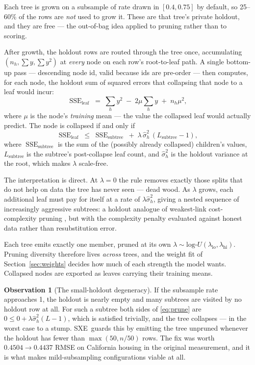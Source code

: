 \documentclass[11pt,a4paper]{article}
\newcommand{\SXE}{\textsc{SXE}}
\DeclareMathOperator{\SSE}{SSE}
\theoremstyle{definition}
\newtheorem{observation}{Observation}
\begin{document}
Each tree is grown on a subsample of rate drawn in $[0.4, 0.75]$ by default, so
25--60\% of the rows are \emph{not} used to grow it. These are that tree's
private holdout, and they are free --- the out-of-bag idea \cite{breiman1996oob}
applied to pruning rather than to scoring.

After growth, the holdout rows are routed through the tree once, accumulating
$(n_h, \sum y, \sum y^2)$ at \emph{every} node on each row's root-to-leaf path.
A single bottom-up pass --- descending node id, valid because ids are
pre-order --- then computes, for each node, the holdout sum of squared errors
that collapsing that node to a leaf would incur:
\begin{equation}\label{eq:sseleaf}
\SSE_{\text{leaf}} \;=\; \sum_h y^2 \;-\; 2\mu \sum_h y \;+\; n_h \mu^2,
\end{equation}
where $\mu$ is the node's \emph{training} mean --- the value the collapsed leaf
would actually predict. The node is collapsed if and only if
\begin{equation}\label{eq:prune}
\SSE_{\text{leaf}} \;\le\; \SSE_{\text{subtree}} \;+\;
\lambda\,\hat\sigma^2_h\,(L_{\text{subtree}} - 1),
\end{equation}
where $\SSE_{\text{subtree}}$ is the sum of the (possibly already collapsed)
children's values, $L_{\text{subtree}}$ is the subtree's post-collapse leaf
count, and $\hat\sigma^2_h$ is the holdout variance at the root, which makes
$\lambda$ scale-free.

The interpretation is direct. At $\lambda = 0$ the rule removes exactly those
splits that do not help on data the tree has never seen --- dead wood. As
$\lambda$ grows, each additional leaf must pay for itself at a rate of
$\lambda\hat\sigma^2_h$, giving a nested sequence of increasingly aggressive
subtrees: a holdout analogue of weakest-link cost-complexity pruning
\cite{breiman1984cart}, but with the complexity penalty evaluated against
honest data rather than resubstitution error.

Each tree emits exactly one member, pruned at its own
$\lambda \sim \text{log-}U(\lambda_{\text{lo}}, \lambda_{\text{hi}})$. Pruning
diversity therefore lives \emph{across} trees, and the weight fit of
Section~\ref{sec:weights} decides how much of each strength the model wants.
Collapsed nodes are exported as leaves carrying their training means.

\begin{observation}[The small-holdout degeneracy]\label{obs:guard}
If the subsample rate approaches 1, the holdout is nearly empty and many
subtrees are visited by no holdout row at all. For such a subtree both sides of
\eqref{eq:prune} are $0 \le 0 + \lambda\hat\sigma_h^2(L-1)$, which is satisfied
trivially, and the tree collapses --- in the worst case to a stump. \SXE\
guards this by emitting the tree unpruned whenever the holdout has fewer than
$\max(50, n/50)$ rows. The fix was worth $0.4504 \to 0.4437$ RMSE on California
housing in the original measurement, and it is what makes mild-subsampling
configurations viable at all.
\end{observation}
\end{document}
